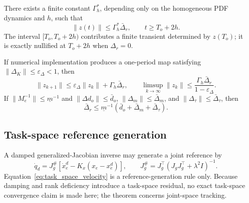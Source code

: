 \begin{corollary}\label{cor:arbitrary_time}
There exists a finite constant $\Gamma_h^*$, depending only on the homogeneous
PDF dynamics and $h$, such that
\begin{equation}
 \|z(t)\|\leq\Gamma_h^*\bar\Delta_r,
 \qquad t\geq T_o+2h.
\end{equation}
The interval $[T_o,T_o+2h)$ contributes a finite transient determined by
$z(T_o)$; it is exactly nullified at $T_o+2h$ when $\Delta_r=0$.
\end{corollary}

If numerical implementation produces a one-period map satisfying
$\|\Delta_K\|\leq\varepsilon_\Delta<1$, then
\begin{equation}
 \|z_{k+1}\|\leq\varepsilon_\Delta\|z_k\|
 +\Gamma_h\bar\Delta_r,
 \qquad
 \limsup_{k\to\infty}\|z_k\|
 \leq\frac{\Gamma_h\bar\Delta_r}{1-\varepsilon_\Delta}.
 \label{eq:approx_nullification_bound}
\end{equation}
If $\|M_e^{-1}\|\leq\underline m^{-1}$ and
$\|\Delta d_o\|\leq\bar d_o$, $\|\Delta_m\|\leq\bar\Delta_m$,
and $\|\Delta_\tau\|\leq\bar\Delta_\tau$, then
\begin{equation}
 \bar\Delta_r\leq\underline m^{-1}
 (\bar d_o+\bar\Delta_m+\bar\Delta_\tau).
 \label{eq:explicit_delta_bar}
\end{equation}

\subsection{Task-space reference generation}
A damped generalized-Jacobian inverse may generate a joint reference by
\begin{equation}
 \dot q_d=J_g^\#[\dot x_e^d-K_x(x_e-x_e^d)],\qquad
 J_g^\#=J_g^\top(J_gJ_g^\top+\lambda^2I)^{-1}.
 \label{eq:task_space_velocity}
\end{equation}
Equation~\eqref{eq:task_space_velocity} is a reference-generation rule only.
Because damping and rank deficiency introduce a task-space residual, no exact
task-space convergence claim is made here; the theorem concerns joint-space
tracking.
